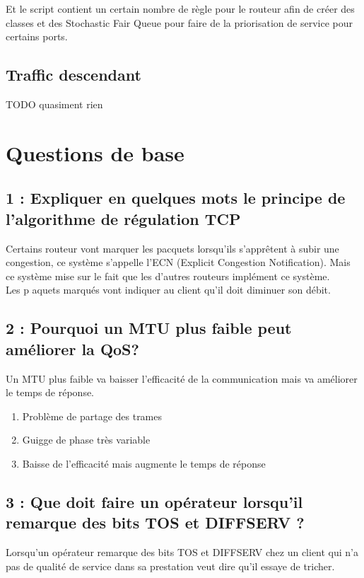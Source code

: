 \documentclass{article}
\begin{document}
Et le script contient un certain nombre de règle pour le routeur afin de créer des classes et des Stochastic Fair Queue pour faire de la priorisation de service pour certains ports.

\subsection{Traffic descendant}
TODO quasiment rien

\section{Questions de base}

\subsection*{1 : Expliquer en quelques mots le principe de l'algorithme de régulation TCP}

Certains routeur vont marquer les pacquets lorsqu'ils s'apprêtent à subir une congestion, ce système s'appelle l'ECN (Explicit Congestion Notification). Mais ce système mise sur le fait que les d'autres routeurs implément ce système. \cite{cours}\\

Les p	aquets marqués vont indiquer au client qu'il doit diminuer son débit.

\subsection*{2 : Pourquoi un MTU plus faible peut améliorer la QoS?}

Un MTU plus faible va baisser l'efficacité de la communication mais va améliorer le temps de réponse.
\begin{enumerate}
\item Problème de partage des trames
\item Guigge de phase très variable
\item Baisse de l'efficacité mais augmente le temps de réponse
\end{enumerate}

\subsection*{3 : Que doit faire un opérateur lorsqu'il remarque des bits TOS et DIFFSERV ?}

Lorsqu'un opérateur remarque des bits TOS \cite{ToS} et DIFFSERV \cite{DiffServ} chez un client qui n'a pas de qualité de service dans sa prestation veut dire qu'il essaye de tricher.\\
\end{document}
